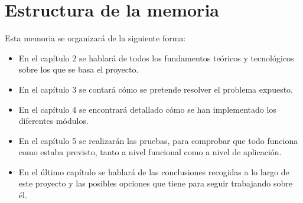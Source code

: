 \section{Estructura de la memoria}

Esta memoria se organizará de la siguiente forma: 
\begin{itemize}
\item En el capítulo 2 se hablará de todos los fundamentos teóricos y tecnológicos sobre los que se 
basa el proyecto.
\item En el capítulo 3 se contará cómo se pretende resolver el problema expuesto.
\item En el capítulo 4 se encontrará detallado cómo se han implementado los diferentes módulos.
\item En el capítulo 5 se realizarán las pruebas, para comprobar que todo funciona como 
estaba previsto, tanto a nivel funcional como a nivel de aplicación.
\item En el último capítulo se hablará de las conclusiones recogidas a lo largo de este proyecto y las posibles 
opciones que tiene para seguir trabajando sobre él.
\end{itemize}

